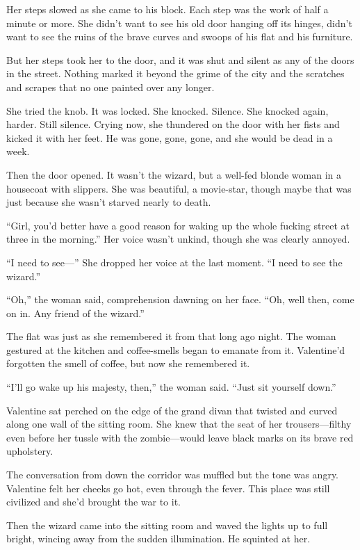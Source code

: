 Her steps slowed as she came to his block. Each step was the work
of half a minute or more. She didn’t want to see his old door
hanging off its hinges, didn’t want to see the ruins of the brave
curves and swoops of his flat and his furniture.

But her steps took her to the door, and it was shut and silent as
any of the doors in the street. Nothing marked it beyond the grime
of the city and the scratches and scrapes that no one painted over
any longer.

She tried the knob. It was locked. She knocked. Silence. She
knocked again, harder. Still silence. Crying now, she thundered on
the door with her fists and kicked it with her feet. He was gone,
gone, gone, and she would be dead in a week.

Then the door opened. It wasn’t the wizard, but a well-fed blonde
woman in a housecoat with slippers. She was beautiful, a
movie-star, though maybe that was just because she wasn’t starved
nearly to death.

“Girl, you’d better have a good reason for waking up the whole
fucking street at three in the morning.” Her voice wasn’t unkind,
though she was clearly annoyed.

“I need to see—” She dropped her voice at the last moment. “I need
to see the wizard.”

“Oh,” the woman said, comprehension dawning on her face. “Oh, well
then, come on in. Any friend of the wizard.”

The flat was just as she remembered it from that long ago night.
The woman gestured at the kitchen and coffee-smells began to
emanate from it. Valentine’d forgotten the smell of coffee, but now
she remembered it.

“I’ll go wake up his majesty, then,” the woman said. “Just sit
yourself down.”

Valentine sat perched on the edge of the grand divan that twisted
and curved along one wall of the sitting room. She knew that the
seat of her trousers—filthy even before her tussle with the
zombie—would leave black marks on its brave red upholstery.

The conversation from down the corridor was muffled but the tone
was angry. Valentine felt her cheeks go hot, even through the
fever. This place was still civilized and she’d brought the war to
it.

Then the wizard came into the sitting room and waved the lights up
to full bright, wincing away from the sudden illumination. He
squinted at her.

